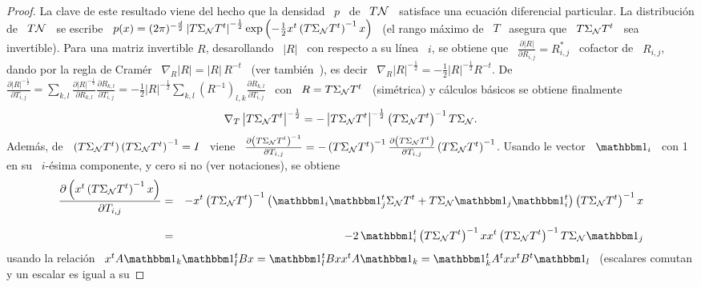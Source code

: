 \begin{proof}
  La clave de este resultado viene del hecho que la densidad \ $p$ \ de \ $T \mathcal{N}$
  \ satisface una ecuaci\'on diferencial  particular.  La distribuci\'on de \ $T
  \mathcal{N}$  \ se  escribe \  $p(x) =  (2 \pi)^{-\frac{d}{2}}  \left| T  \Sigma_{\mathcal{N}} T^t
  \right|^{-\frac12}   \exp\left(  -   \frac12  x^t   \left(  T   \Sigma_{\mathcal{N}}  T^t
    \right)^{-1} x  \right)$ \ (el rango  m\'aximo de \  $T$ \ asegura que  \ $T
  \Sigma_{\mathcal{N}}  T^t$   \  sea  invertible).    Para  una  matriz   invertible  $R$,
  desarollando \  $|R|$ \  con respecto  a su l\'inea  \ $i$,  se obtiene  que \
  $\frac{\partial |R|}{\partial R_{i,j}} = R_{i,j}^*$ \ cofactor de \ $R_{i,j}$,
  dando  por la  regla de  Cram\'er \  $\nabla_R  |R| =  |R| \,  R^{-t}$ \  (ver
  tambi\'en~\cite[cap.~1~\&~9]{MagNeu99}), es decir \ $\nabla_R |R|^{-\frac12} =
  -\frac12 |R|^{-\frac12}  R^{-t}$.  De $\frac{\partial |R|^{-\frac12}}{\partial
    T_{i,j}}  =   \sum_{k,l}  \frac{\partial  |R|^{-\frac12}}{\partial  R_{k,l}}
  \frac{\partial R_{k,l}}{\partial T_{i,j}} = -\frac12 |R|^{-\frac12} \sum_{k,l}
  \left( R^{-1} \right)_{l,k} \frac{\partial R_{k,l}}{\partial T_{i,j}}$ \ con \
  $R  = T  \Sigma_{\mathcal{N}}  T^t$ \  (sim\'etrica)  y c\'alculos  b\'asicos se  obtiene
  finalmente
  \[
  \nabla_T  \left|   T  \Sigma_{\mathcal{N}}  T^t  \right|^{-\frac12}  =   -  \left|  T
    \Sigma_{\mathcal{N}} T^t \right|^{-\frac12} \left( T \Sigma_{\mathcal{N}} T^t \right)^{-1}
  T \Sigma_{\mathcal{N}}.
  \]
  Adem\'as, de \ $\left( T  \Sigma_{\mathcal{N}} T^t \right) \left( T \Sigma_{\mathcal{N}} T^t
  \right)^{-1}  =  I$ \  viene  \  $\frac{\partial  \left( T  \Sigma_{\mathcal{N}}  T^t
    \right)^{-1}}{\partial T_{i,j}} = -  \left( T \Sigma_{\mathcal{N}} T^t \right)^{-1}
  \frac{\partial \left( T \Sigma_{\mathcal{N}}  T^t \right)}{\partial T_{i,j}} \left( T
    \Sigma_{\mathcal{N}} T^t \right)^{-1}$.  Usando le vector \ $\uno_i$ \ con 1 en su \
  $i$-\'esima componente, y cero si no (ver notaciones), se obtiene
  \begin{eqnarray*}
  \frac{\partial \left( x^t \left( T \Sigma_\N T^t \right)^{-1} x
  \right)}{\partial T_{i,j}} & = & - x^t \left( T \Sigma_\N T^t \right)^{-1}
  \left( \uno_i \uno_j^t \Sigma_\N T^t + T \Sigma_\N \uno_j \uno_i^t \right) \left( T
  \Sigma_\N T^t \right)^{-1} x\\[2.5mm]
  & = & - 2 \, \uno_i^t \left( T \Sigma_\N T^t \right)^{-1} x x^t \left( T
  \Sigma_\N T^t \right)^{-1} T \Sigma_\N \uno_j
  \end{eqnarray*}
  usando la relaci\'on  \ $x^t A \uno_k \uno_l^t B  x = \uno_l^t B x  x^t A \uno_k =
  \uno_k^t A^t x x^t  B^t \uno_l$ \ (escalares comutan y un  escalar es igual a su

\end{proof}
